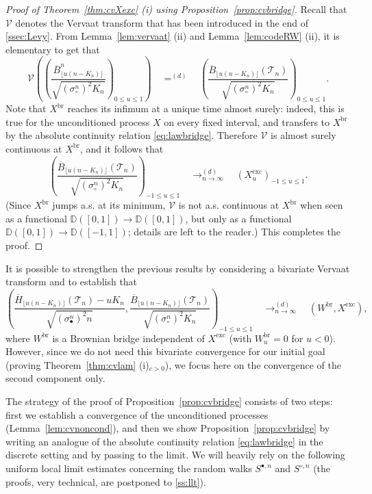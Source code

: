 \documentclass[AHL,XML,longabstracts,Unicode]{cedram}
\newcommand{\D}{\mathbb{D}}
\def\Vc{\mathcal{V}}
\def\scn{\sigma_{\circ}^{n}}
\def\sbn{\sigma_{\bullet}^{n}}
\def\Sbn{S^{\bullet,n}}
\def\Scn{S^{\circ,n}}
\def\oB{\overline{B}}
\def \Xexc{X^{\mathrm{exc}}}
\def \Xbr{X^{\mathrm{br}}}
\def\Ts{\mathscr{T}}
\begin{document}
\begin{proof}[Proof of Theorem~\ref{thm:cvXexc} (i) using Proposition~\ref{prop:cvbridge}] Recall that $\Vc$ denotes the Vervaat transform that has been introduced in the end of \cref{ssec:Levy}. From Lemma~\ref{lem:vervaat} (ii) and Lemma~\ref{lem:codeRW} (ii), it is elementary to get that
\[ \Vc \left(  \left(  \frac{\oB^{n}_{\lfloor u (n-K_{n}) \rfloor}}{ \sqrt{ (\scn)^{2} K_{n} }}  \right) _{{0 \leq u \leq 1}} \right) \quad \mathop{=}^{(d)}  \quad  \left( \frac{\oB_{\lfloor u (n-K_{n}) \rfloor}(\Ts_{n})}{ \sqrt{ (\scn)^{2} K_{n} }}  \right)_{ 0 \leq u \leq 1}.\]
Note that $\Xbr$ reaches its infimum at a unique time almost surely:
indeed, this is true for the unconditioned process $X$ on every fixed interval, and transfers to $\Xbr$ by the absolute continuity relation \eqref{eq:lawbridge}.
Therefore
$\Vc$ is almost surely continuous at $\Xbr$, and it follows that
\begin{equation}
\left( \frac{\oB_{\lfloor u (n-K_{n}) \rfloor}(\Ts_{n})}{ \sqrt{ (\scn)^{2} K_{n} }}  \right)_{ -1 \leq u \leq 1} \quad \mathop{\longrightarrow}_{n \rightarrow \infty}^{(d)} \quad (\Xexc_{u})_{-1 \leq u \leq 1}.
   \label{eq:cvHB}
 \end{equation}
 (Since $\Xbr$ jumps a.s. at its minimum, $\Vc$ is not a.s. continuous at $\Xbr$ when seen as a functional
 $\D([0,1]) \to \D([0,1])$, but only as a functional $\D([0,1]) \to \D([-1,1])$;
 details are left to the reader.)
This completes the proof.
\end{proof}

\begin{remark} It is possible to strengthen the previous results by considering a bivariate Vervaat transform and to establish that
\[   \left( \frac{\overline{H}_{\lfloor u (n-K_{n}) \rfloor}(\Ts_{n})-u K_{n}}{ \sqrt{ (\sbn)^{2} n} }, \frac{\oB_{\lfloor u (n-K_{n}) \rfloor}(\Ts_{n})}{ \sqrt{ (\scn)^{2} K_{n} }}  \right)_{ -1 \leq u \leq 1}   \quad \mathop{\longrightarrow}_{n \rightarrow \infty}^{(d)} \quad  (W^{\mathrm{br}},\Xexc),\]
where $ W^{\mathrm{br}}$ is a Brownian bridge independent of $\Xexc$ (with $W^{\mathrm{br}}_{u}=0$ for $u<0$).
However, since we do not need this bivariate convergence for our initial goal (proving Theorem~\ref{thm:cvlam} (i)$_{c>0}$),
we focus here on the convergence of the second component only.
\end{remark}


The strategy of the proof of Proposition~\ref{prop:cvbridge} consists of two steps: first we establish a convergence of the unconditioned processes (Lemma~\ref{lem:cvnoncond}), and then we show Proposition~\ref{prop:cvbridge} by writing an analogue of the absolute continuity relation \eqref{eq:lawbridge} in the discrete setting and by passing to the limit. We will  heavily rely on the following uniform local limit estimates concerning the random walks $\Sbn$ and $\Scn$ (the proofs, very technical, are postponed to \cref{ss:llt}).
\end{document}
